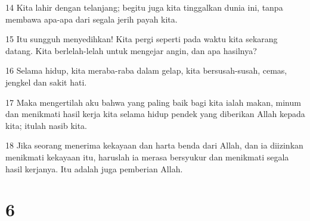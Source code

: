 \par 14 Kita lahir dengan telanjang; begitu juga kita tinggalkan dunia ini, tanpa membawa apa-apa dari segala jerih payah kita.
\par 15 Itu sungguh menyedihkan! Kita pergi seperti pada waktu kita sekarang datang. Kita berlelah-lelah untuk mengejar angin, dan apa hasilnya?
\par 16 Selama hidup, kita meraba-raba dalam gelap, kita bersusah-susah, cemas, jengkel dan sakit hati.
\par 17 Maka mengertilah aku bahwa yang paling baik bagi kita ialah makan, minum dan menikmati hasil kerja kita selama hidup pendek yang diberikan Allah kepada kita; itulah nasib kita.
\par 18 Jika seorang menerima kekayaan dan harta benda dari Allah, dan ia diizinkan menikmati kekayaan itu, haruslah ia merasa bersyukur dan menikmati segala hasil kerjanya. Itu adalah juga pemberian Allah.

\chapter{6}

